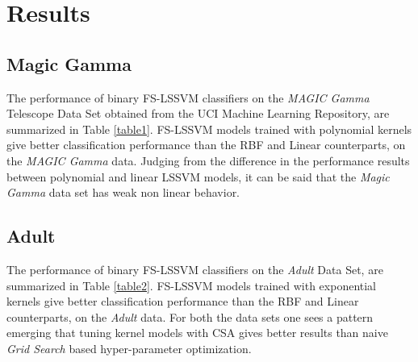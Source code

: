 \section{Results}

\subsection*{Magic Gamma}
The performance of binary FS-LSSVM classifiers on the \textit{MAGIC Gamma} Telescope Data Set obtained from the UCI Machine Learning Repository, are summarized in Table \ref{table1}. FS-LSSVM models trained with polynomial kernels give better classification performance than the RBF and Linear counterparts, on the \textit{MAGIC Gamma} data. Judging from the difference in the performance results between polynomial and linear LSSVM models, it can be said that the \textit{Magic Gamma} data set has weak non linear behavior.
 
\begin{table*}[!htbp]
\caption{Magic Gamma Test Results}
\begin{center}
\end{center}
\end{table*}

\subsection*{Adult}
The performance of binary FS-LSSVM classifiers on the \textit{Adult} Data Set, are summarized in Table \ref{table2}. FS-LSSVM models trained with exponential kernels give better classification performance than the RBF and Linear counterparts, on the \textit{Adult} data. For both the data sets one sees a pattern emerging that tuning kernel models with CSA gives better results than naive \textit{Grid Search} based hyper-parameter optimization.

